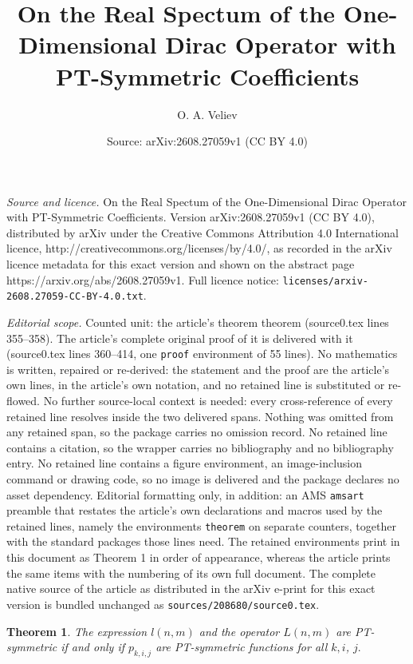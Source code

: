 \documentclass[10pt,a4paper]{amsart}
\title{On the Real Spectum of the One-Dimensional Dirac Operator with PT-Symmetric Coefficients}
\author{O. A. Veliev}
\date{Source: arXiv:2608.27059v1 (CC BY 4.0)}
\newtheorem{theorem}{Theorem}
\begin{document}
\maketitle

\noindent\emph{Source and licence.} On the Real Spectum of the One-Dimensional Dirac Operator with PT-Symmetric Coefficients. Version arXiv:2608.27059v1 (CC BY 4.0), distributed by arXiv under the Creative Commons Attribution 4.0 International licence, http://creativecommons.org/licenses/by/4.0/, as recorded in the arXiv licence metadata for this exact version and shown on the abstract page https://arxiv.org/abs/2608.27059v1. Full licence notice: \texttt{licenses/arxiv-2608.27059-CC-BY-4.0.txt}.\par\smallskip

\noindent\textit{Editorial scope.} Counted unit: the article's theorem theorem (source0.tex lines 355--358). The article's complete original proof of it is delivered with it (source0.tex lines 360--414, one \texttt{proof} environment of 55 lines). No mathematics is written, repaired or re-derived: the statement and the proof are the article's own lines, in the article's own notation, and no retained line is substituted or re-flowed.  No further source-local context is needed: every cross-reference of every retained line resolves inside the two delivered spans.  Nothing was omitted from any retained span, so the package carries no omission record.  No retained line contains a citation, so the wrapper carries no bibliography and no bibliography entry.  No retained line contains a figure environment, an image-inclusion command or drawing code, so no image is delivered and the package declares no asset dependency.  Editorial formatting only, in addition: an AMS \texttt{amsart} preamble that restates the article's own declarations and macros used by the retained lines, namely the environments \texttt{theorem} on separate counters, together with the standard packages those lines need.  The retained environments print in this document as Theorem 1 in order of appearance, whereas the article prints the same items with the numbering of its own full document.  The complete native source of the article as distributed in the arXiv e-print for this exact version is bundled unchanged as \texttt{sources/208680/source0.tex}.
\begin{theorem}
The expression $l(n,m)$ and the operator $L(n,m)$ are PT-symmetric if and only
if $p_{k,i,j}$ are PT-symmetric functions for all $k,i$, $j.$
\end{theorem}
\end{document}
